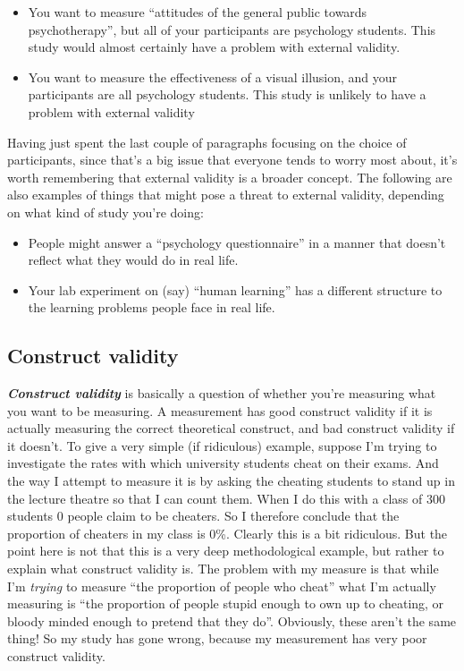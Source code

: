 \documentclass[
]{book}
\providecommand{\tightlist}{%
  \setlength{\itemsep}{0pt}\setlength{\parskip}{0pt}}
\begin{document}
\begin{itemize}
\tightlist
\item
  You want to measure ``attitudes of the general public towards psychotherapy'', but all of your participants are psychology students. This study would almost certainly have a problem with external validity.
\item
  You want to measure the effectiveness of a visual illusion, and your participants are all psychology students. This study is unlikely to have a problem with external validity
\end{itemize}

Having just spent the last couple of paragraphs focusing on the choice of participants, since that's a big issue that everyone tends to worry most about, it's worth remembering that external validity is a broader concept. The following are also examples of things that might pose a threat to external validity, depending on what kind of study you're doing:

\begin{itemize}
\tightlist
\item
  People might answer a ``psychology questionnaire'' in a manner that doesn't reflect what they would do in real life.
\item
  Your lab experiment on (say) ``human learning'' has a different structure to the learning problems people face in real life.
\end{itemize}

\hypertarget{construct-validity}{%
\subsection{Construct validity}\label{construct-validity}}

\textbf{\emph{Construct validity}} is basically a question of whether you're measuring what you want to be measuring. A measurement has good construct validity if it is actually measuring the correct theoretical construct, and bad construct validity if it doesn't. To give a very simple (if ridiculous) example, suppose I'm trying to investigate the rates with which university students cheat on their exams. And the way I attempt to measure it is by asking the cheating students to stand up in the lecture theatre so that I can count them. When I do this with a class of 300 students 0 people claim to be cheaters. So I therefore conclude that the proportion of cheaters in my class is 0\%. Clearly this is a bit ridiculous. But the point here is not that this is a very deep methodological example, but rather to explain what construct validity is. The problem with my measure is that while I'm \emph{trying} to measure ``the proportion of people who cheat'' what I'm actually measuring is ``the proportion of people stupid enough to own up to cheating, or bloody minded enough to pretend that they do''. Obviously, these aren't the same thing! So my study has gone wrong, because my measurement has very poor construct validity.
\end{document}
